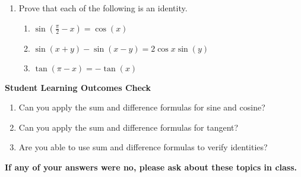 \begin{enumerate}
\item Prove that each of the following is an identity.

\begin{enumerate}
\item $\sin \left(\frac{\pi}{2}-x\right)=\cos(x)$
\vfill

\item $\sin(x+y)-\sin(x-y) = 2 \cos x \sin(y)$
\vfill

\item $\tan(\pi-x)=-\tan(x)$
\vfill


\end{enumerate}



\end{enumerate}

\noindent \textbf{Student Learning Outcomes Check}

\begin{enumerate}
\item Can you apply the sum and difference formulas for sine and cosine?
\item Can you apply the sum and difference formulas for tangent?
\item Are you able to use sum and difference formulas to verify identities?
\end{enumerate}

\noindent \textbf{If any of your answers were no, please ask about these topics in class.}

